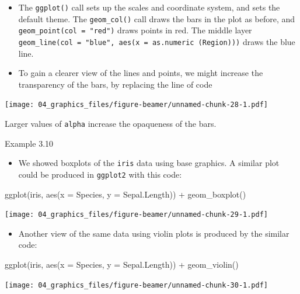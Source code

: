 \documentclass[
  9pt,
  a4paper,
  ignorenonframetext,
  notheorems]{beamer}
\newenvironment{Shaded}{\begin{snugshade}}{\end{snugshade}}
\newcommand{\AttributeTok}[1]{\textcolor[rgb]{0.40,0.45,0.13}{#1}}
\newcommand{\FunctionTok}[1]{\textcolor[rgb]{0.28,0.35,0.67}{#1}}
\newcommand{\NormalTok}[1]{\textcolor[rgb]{0.00,0.23,0.31}{#1}}
\newcommand{\SpecialCharTok}[1]{\textcolor[rgb]{0.37,0.37,0.37}{#1}}
\providecommand{\tightlist}{%
  \setlength{\itemsep}{0pt}\setlength{\parskip}{0pt}}\usepackage{longtable,booktabs,array}
\begin{document}
\begin{frame}[fragile]
\begin{itemize}
\item
  The \texttt{ggplot()} call sets up the scales and coordinate system,
  and sets the default theme. The \texttt{geom\_col()} call draws the
  bars in the plot as before, and \texttt{geom\_point(col\ =\ "red")}
  draws points in red. The middle layer
  \texttt{geom\_line(col\ =\ "blue",\ aes(x\ =\ as.numeric\ (Region)))}
  draws the blue line.
\item
  To gain a clearer view of the lines and points, we might increase the
  transparency of the bars, by replacing the line of code
\end{itemize}

\texttt{[image: 04\_graphics\_files/figure-beamer/unnamed-chunk-28-1.pdf]}

Larger values of \texttt{alpha} increase the opaqueness of the bars.

\begin{block}{Example 3.10}
\protect\hypertarget{example-3.10}{}
\begin{itemize}
\tightlist
\item
  We showed boxplots of the \texttt{iris} data using base graphics. A
  similar plot could be produced in \texttt{ggplot2} with this code:
\end{itemize}
\end{block}
\end{frame}

\begin{frame}[fragile]
\begin{Shaded}
\begin{Highlighting}[]
\FunctionTok{ggplot}\NormalTok{(iris, }\FunctionTok{aes}\NormalTok{(}\AttributeTok{x =}\NormalTok{ Species, }\AttributeTok{y =}\NormalTok{ Sepal.Length)) }\SpecialCharTok{+} \FunctionTok{geom\_boxplot}\NormalTok{()}
\end{Highlighting}
\end{Shaded}

\texttt{[image: 04\_graphics\_files/figure-beamer/unnamed-chunk-29-1.pdf]}
\end{frame}

\begin{frame}[fragile]
\begin{itemize}
\tightlist
\item
  Another view of the same data using violin plots is produced by the
  similar code:
\end{itemize}

\begin{Shaded}
\begin{Highlighting}[]
\FunctionTok{ggplot}\NormalTok{(iris, }\FunctionTok{aes}\NormalTok{(}\AttributeTok{x =}\NormalTok{ Species, }\AttributeTok{y =}\NormalTok{ Sepal.Length)) }\SpecialCharTok{+} \FunctionTok{geom\_violin}\NormalTok{()}
\end{Highlighting}
\end{Shaded}

\texttt{[image: 04\_graphics\_files/figure-beamer/unnamed-chunk-30-1.pdf]}
\end{frame}
\end{document}
